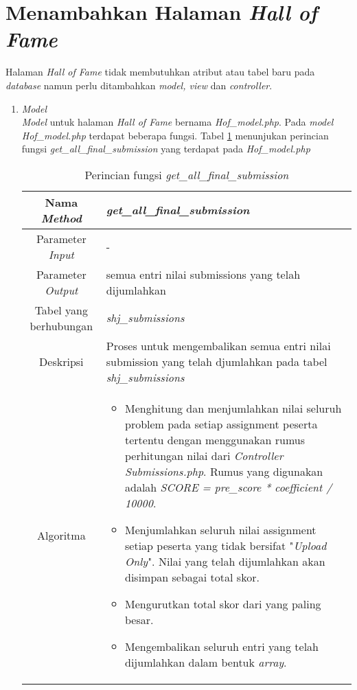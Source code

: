 \section{Menambahkan Halaman \textit{Hall of Fame}}
Halaman \textit{Hall of Fame} tidak membutuhkan atribut atau tabel baru pada \textit{database} namun perlu ditambahkan \textit{model, view} dan \textit{controller}.

\begin{enumerate}
	\item \textit{Model} \\
	\textit{Model} untuk halaman \textit{Hall of Fame} bernama \textit{Hof\_model.php}. Pada \textit{model Hof\_model.php} terdapat beberapa fungsi. Tabel \ref{tab:f1hof} menunjukan perincian fungsi \textit{get\_all\_final\_submission} yang terdapat pada \textit{Hof\_model.php}
	\begin{table}[H]
		\caption{Perincian fungsi \textit{get\_all\_final\_submission}}
		\label{tab:f1hof}
		\begin{tabular}{|c|p{11cm}|}
			\hline
			Nama \textit{Method} 	& 	\textit{get\_all\_final\_submission} 	\\
			\hline
			Parameter \textit{Input} & - \\
			\hline
			Parameter \textit{Output} & semua entri nilai submissions yang telah dijumlahkan \\
			\hline
			Tabel yang berhubungan & \textit{shj\_submissions} \\
			\hline
			Deskripsi	& Proses untuk mengembalikan semua entri nilai submission yang telah djumlahkan pada tabel \textit{shj\_submissions} \\
			\hline
			Algoritma	& \begin{itemize}
				\item Menghitung dan menjumlahkan nilai seluruh problem pada setiap assignment peserta tertentu dengan menggunakan rumus perhitungan nilai dari \textit{Controller Submissions.php}. Rumus yang digunakan adalah \textit{SCORE = pre\_score * coefficient / 10000}.
				\item Menjumlahkan seluruh nilai assignment setiap peserta yang tidak bersifat "\textit{Upload Only}". Nilai yang telah dijumlahkan akan disimpan sebagai total skor.
				\item Mengurutkan total skor dari yang paling besar.
				\item Mengembalikan seluruh entri yang telah dijumlahkan dalam bentuk \textit{array}.
			\end{itemize} \\
			\hline
		\end{tabular}
	\end{table}
	

\end{enumerate}
